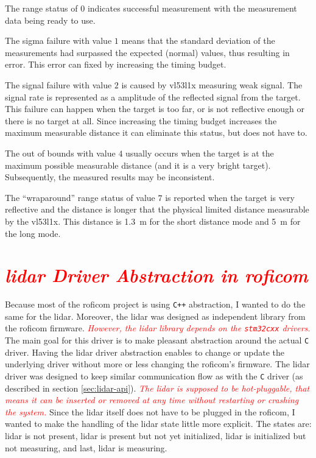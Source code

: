 \documentclass[
  digital,     %
  oneside,     %
  nosansbold,  %
  nocolorbold, %
  lof,         %
  lot,         %
]{fithesis4}
\newcommand{\TODO}[1]{\textcolor{red}{\textit{#1}}}
\begin{document}
{{{The range status of $0$ indicates successful measurement with the measurement data being ready to use.

The sigma failure with value $1$ means that the standard deviation of the measurements had surpassed the expected (normal) values, thus resulting in error. This error can fixed by increasing the timing budget.

The signal failure with value $2$ is caused by \gls{vl53l1x} measuring weak signal. The signal rate is represented as a amplitude of the reflected signal from the target. This failure can happen when the target is too far, or is not reflective enough or there is no target at all. Since increasing the timing budget increases the maximum measurable distance it can eliminate this status, but does not have to.

The out of bounds with value $4$ usually occurs when the target is at the maximum possible measurable distance (and it is a very bright target). Subsequently, the measured results may be inconsistent.

The ``wraparound'' range status of value $7$ is reported when the target is very reflective and the distance is longer that the physical limited distance measurable by the \gls{vl53l1x}. This distance is \qty{1.3}{\metre} for the short distance mode and \qty{5}{\metre} for the long mode.

\section[ LiDAR Diver ]{ \TODO{ \acrshort{lidar} Driver Abstraction in \acrshort{roficom} } } \label{sec:lidar-driver}

Because most of the \acrshort{roficom} project is using \verb|C++| abstraction, I wanted to do the same for the \acrshort{lidar}. Moreover, the \acrshort{lidar} was designed as independent library from the \acrshort{roficom} firmware. \TODO{However, the \acrshort{lidar} library depends on the \texttt{stm32cxx} drivers.} The main goal for this driver is to make pleasant abstraction around the actual \verb|C| driver. Having the \acrshort{lidar} driver abstraction enables to change or update the underlying driver without more or less changing the \acrshort{roficom}'s firmware. The \acrshort{lidar} driver was designed to keep similar communication flow as with the \verb|C| driver (as described in section \ref{sec:lidar-api}). \TODO{The \acrshort{lidar} is supposed to be \emph{hot-pluggable}, that means it can be inserted or removed at any time without restarting or crashing the system.} Since the \acrshort{lidar} itself does not have to be plugged in the \acrshort{roficom}, I wanted to make the handling of the \acrshort{lidar} state little more explicit. The states are: \acrshort{lidar} is not present, \acrshort{lidar} is present but not yet initialized, \acrshort{lidar} is initialized but not measuring, and last, \acrshort{lidar} is measuring. 

}}}
\end{document}
